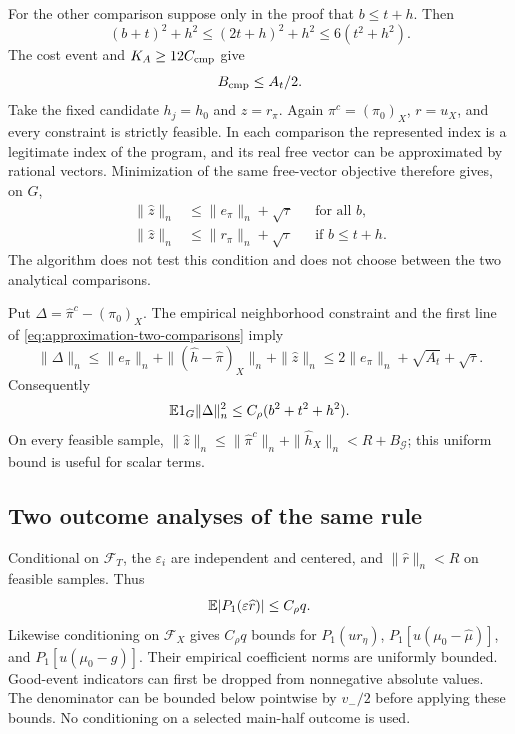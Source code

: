 For the other comparison suppose only in the proof that $b\le t+h$.
Then
\[
 (b+t)^2+h^2\le(2t+h)^2+h^2\le6(t^2+h^2).
\]
The cost event and $K_A\ge12C_{\rm cmp}$ give
\begin{equation}
 B_{\rm cmp}\le A_t/2.
 \label{eq:approximation-local-comparator}
\end{equation}
Take the fixed candidate $h_j=h_0$ and $z=r_\pi$. Again
$\pi^c=(\pi_0)_X$, $r=u_X$, and every constraint is strictly
feasible. In each comparison the represented index is a legitimate
index of the program, and its real free vector can be approximated
by rational vectors. Minimization of the same free-vector objective
therefore gives, on $G$,
\begin{equation}
 \begin{aligned}
 \|\widehat z\|_n&\le\|e_\pi\|_n+\sqrt\tau
       &&\text{for all }b,\\
 \|\widehat z\|_n&\le\|r_\pi\|_n+\sqrt\tau
       &&\text{if }b\le t+h.
 \end{aligned}
 \label{eq:approximation-two-comparisons}
\end{equation}
The algorithm does not test this condition and does not choose between
the two analytical comparisons.

Put $\Delta=\widehat\pi^c-(\pi_0)_X$. The empirical neighborhood
constraint and the first line of
\eqref{eq:approximation-two-comparisons} imply
\[
 \|\Delta\|_n
 \le\|e_\pi\|_n+\|(\widehat h-\widehat\pi)_X\|_n
       +\|\widehat z\|_n
 \le2\|e_\pi\|_n+\sqrt{A_t}+\sqrt\tau.
\]
Consequently
\begin{equation}
 \mathbb E1_G\|\Delta\|_n^2\le C_\rho(b^2+t^2+h^2).
 \label{eq:approximation-propensity-moment}
\end{equation}
On every feasible sample,
$\|\widehat z\|_n\le\|\widehat\pi^c\|_n+\|\widehat h_X\|_n
<R+B_{\mathcal G}$; this uniform bound is useful for scalar terms.

\subsection{Two outcome analyses of the same rule}
\label{app:approximation-outcome-bound}

Conditional on $\mathcal F_T$, the $\varepsilon_i$ are independent
and centered, and $\|\widehat r\|_n<R$ on feasible samples. Thus
\begin{equation}
 \mathbb E|P_1(\varepsilon\widehat r)|\le C_\rho q.
 \label{eq:approximation-outcome-noise}
\end{equation}
Likewise conditioning on $\mathcal F_X$ gives $C_\rho q$ bounds for
$P_1(ur_\eta)$, $P_1[u(\mu_0-\widehat\mu)]$, and
$P_1[u(\mu_0-g)]$. Their empirical coefficient norms are uniformly
bounded. Good-event indicators can first be dropped from nonnegative
absolute values. The denominator can be bounded below pointwise by
$v_-/2$ before applying these bounds. No conditioning on a selected
main-half outcome is used.

